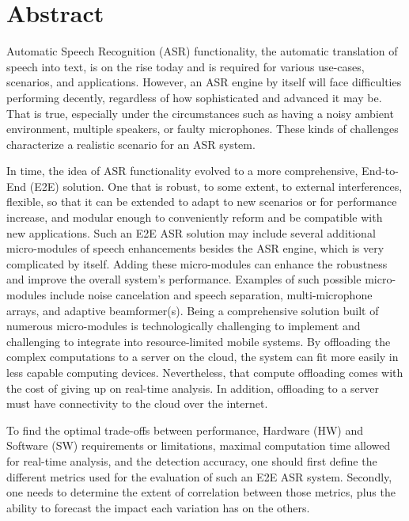 \chapter*{Abstract}
\vspace*{-1cm}
Automatic Speech Recognition (ASR) functionality,
the automatic translation of
speech into text, 
is on the rise today and is required for 
various use-cases,
scenarios, and applications.
However, 
an ASR engine by itself will face difficulties 
performing decently, 
regardless of how sophisticated and advanced it may be.
That is true, 
especially under the circumstances 
such as having a noisy ambient environment,
multiple speakers, or faulty microphones.
These kinds of challenges characterize 
a realistic scenario for an ASR system.

In time, the idea of ASR functionality evolved
to a more comprehensive, End-to-End (E2E) solution.
One that is robust, to some extent, to 
external interferences, 
flexible, so that it can be extended 
to adapt to new scenarios or for performance increase,
and modular enough to 
conveniently reform and be compatible 
with new applications.
Such an E2E ASR solution may include 
several additional micro-modules 
of speech enhancements besides the ASR engine, 
which is very complicated by itself. 
Adding these micro-modules can enhance the robustness 
and improve the overall system's performance.
Examples of such possible micro-modules include 
noise cancelation and speech separation, 
multi-microphone arrays, and adaptive beamformer(s).
Being a comprehensive solution built of
numerous micro-modules is technologically 
challenging to implement
and challenging to integrate into resource-limited
mobile systems. 
By offloading the complex computations to a server
on the cloud, 
the system can fit more easily in less capable computing devices. 
Nevertheless, that compute offloading comes with the cost of
giving up on real-time analysis. 
In addition, offloading to a server must have
connectivity to the cloud over the internet.

To find the optimal trade-offs between performance,
Hardware (HW) and Software (SW) 
requirements or limitations, 
maximal computation time 
allowed for real-time analysis,
and the detection accuracy,
one should first define the different metrics 
used for the evaluation 
of such an E2E ASR system.
Secondly, one needs to determine 
the extent of correlation between those 
metrics, plus the ability to forecast the
impact each variation has on the others.

